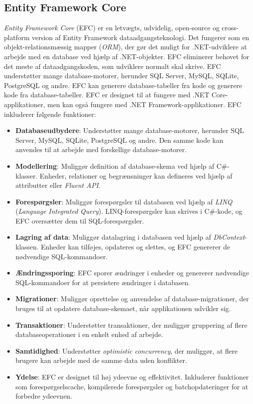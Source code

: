 \subsection{Entity Framework Core}
\emph{Entity Framework Core} (EFC) er en letvægts, udvidelig, open-source og cross-platform version af Entity Framework dataadgangsteknologi. Det fungerer som en objekt-relationsmæssig mapper (\emph{ORM}), der gør det muligt for .NET-udviklere at arbejde med en database ved hjælp af .NET-objekter. EFC eliminerer behovet for det meste af dataadgangskoden, som udviklere normalt skal skrive. EFC understøtter mange database-motorer, herunder SQL Server, MySQL, SQLite, PostgreSQL og andre. EFC kan generere database-tabeller fra kode og generere kode fra database-tabeller. EFC er designet til at fungere med .NET Core-applikationer, men kan også fungere med .NET Framework-applikationer.
EFC inkluderer følgende funktioner:
\begin{itemize}
\item \textbf{Databaseudbydere}: Understøtter mange database-motorer, herunder SQL Server, MySQL, SQLite, PostgreSQL og andre. Den samme kode kan anvendes til at arbejde med forskellige database-motorer.
\item \textbf{Modellering}: Muliggør definition af database-skema ved hjælp af C\#-klasser. Enheder, relationer og begrænsninger kan defineres ved hjælp af attributter eller \emph{Fluent API}.
\item \textbf{Forespørgsler}: Muliggør forespørgsler til databasen ved hjælp af \emph{LINQ} (\emph{Language Integrated Query}). LINQ-forespørgsler kan skrives i C\#-kode, og EFC oversætter dem til SQL-forespørgsler.
\item \textbf{Lagring af data}: Muliggør datalagring i databasen ved hjælp af \emph{DbContext}-klassen. Enheder kan tilføjes, opdateres og slettes, og EFC genererer de nødvendige SQL-kommandoer.
\item \textbf{Ændringssporing}: EFC sporer ændringer i enheder og genererer nødvendige SQL-kommandoer for at persistere ændringer i databasen.
\item \textbf{Migrationer}: Muliggør oprettelse og anvendelse af database-migrationer, der bruges til at opdatere database-skemaet, når applikationen udvikler sig.
\item \textbf{Transaktioner}: Understøtter transaktioner, der muliggør gruppering af flere databaseoperationer i en enkelt enhed af arbejde.
\item \textbf{Samtidighed}: Understøtter \emph{optimistic concurrency}, der muliggør, at flere brugere kan arbejde med de samme data uden konflikter.
\item \textbf{Ydelse}: EFC er designet til høj ydeevne og effektivitet. Inkluderer funktioner som forespørgselscache, kompilerede forespørgsler og batchopdateringer for at forbedre ydeevnen.
\end{itemize}

